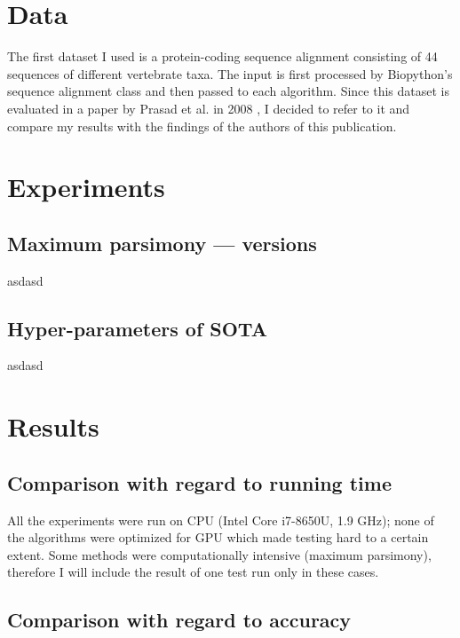 \documentclass[11pt,twocolumn]{article}
\begin{document}
\section{Data}

The first dataset I used is a protein-coding sequence alignment \cite{dataset} consisting of 44 sequences of different vertebrate taxa. The input is first processed by Biopython's sequence alignment class and then passed to each algorithm. Since this dataset is evaluated in a paper by Prasad et al. in 2008 \cite{Prasad2008}, I decided to refer to it and compare my results with the findings of the authors of this publication.

\section{Experiments}

\subsection{Maximum parsimony — versions}

asdasd

\subsection{Hyper-parameters of SOTA}

asdasd

\section{Results}

\subsection{Comparison with regard to running time}

All the experiments were run on CPU (Intel Core i7-8650U, 1.9 GHz); none of the algorithms were optimized for GPU which made testing hard to a certain extent. Some methods were computationally intensive (maximum parsimony), therefore I will include the result of one test run only in these cases.

\subsection{Comparison with regard to accuracy}
\end{document}
